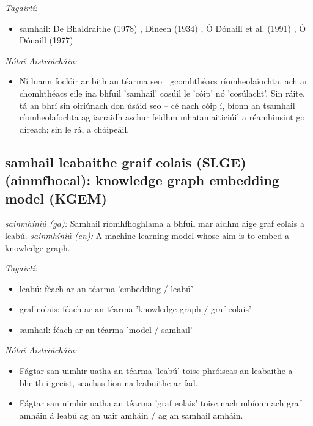 \documentclass{article}
\begin{document}
 \noindent \textit{Tagairtí:}
\begin{itemize}
	\item samhail: De Bhaldraithe (1978) \cite{de-bhaldraithe}, Dineen (1934) \cite{dineen}, Ó Dónaill et al. (1991) \cite{focloir-beag}, Ó Dónaill (1977) \cite{odonaill}
\end{itemize}

 \noindent \textit{Nótaí Aistriúcháin:}
\begin{itemize}
	\item Ní luann foclóir ar bith an téarma seo i gcomhthéacs ríomheolaíochta, ach ar chomhthéacs eile ina bhfuil 'samhail' cosúil le 'cóip' nó 'cosúlacht'. Sin ráite, tá an bhrí sin oiriúnach don úsáid seo -- cé nach cóip í, bíonn an tsamhail ríomheolaíochta ag iarraidh aschur feidhm mhatamaiticiúil a réamhinsint go díreach; sin le rá, a chóipeáil.
\end{itemize}


\subsection*{samhail leabaithe graif eolais (SLGE) (ainmfhocal): knowledge graph embedding model (KGEM)} 
 \noindent \textit{sainmhíniú (ga):} Samhail ríomhfhoghlama a bhfuil mar aidhm aige graf eolais a leabú.
\newline\newline
 \noindent \textit{sainmhíniú (en):} A machine learning model whose aim is to embed a knowledge graph.
\newline

 \noindent \textit{Tagairtí:}
\begin{itemize}
	\item leabú: féach ar an téarma 'embedding / leabú'
	\item graf eolais: féach ar an téarma 'knowledge graph / graf eolais'
	\item samhail: féach ar an téarma 'model / samhail'
\end{itemize}

 \noindent \textit{Nótaí Aistriúcháin:}
\begin{itemize}
	\item Fágtar san uimhir uatha an téarma 'leabú' toisc phróiseas an leabaithe a bheith i gceist, seachas líon na leabuithe ar fad.
	\item Fágtar san uimhir uatha an téarma 'graf eolais' toisc nach mbíonn ach graf amháin á leabú ag an uair amháin / ag an samhail amháin.
\end{itemize}
\end{document}
